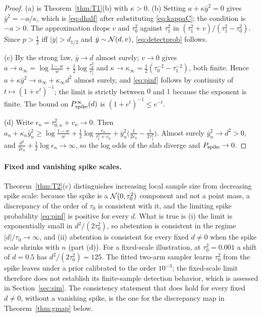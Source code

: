 \begin{proof}
(a) is Theorem~\ref{thm:T1}(b) with $\kappa>0$. (b) Setting $a+\kappa\bar y^2=0$ gives $\bar y^2=-a/\kappa$, which is \eqref{eq:dhalf} after substituting \eqref{eq:kappaC}; the condition is $-a>0$. The approximation drops $v$ and $\tau_0^2$ against $\tau_1^2$ in $(\tau_1^2+v)/(\tau_1^2-\tau_0^2)$. Since $p>\tfrac12$ iff $|\bar y|>d_{1/2}$ and $\bar y\sim\mathcal{N}(d,v)$, \eqref{eq:detectprob} follows.

(c) By the strong law, $\bar y\to d$ almost surely; $v\to0$ gives $a\to a_\infty=\log\frac{1-w}{w}+\frac12\log\frac{\tau_0^2}{\tau_1^2}$ and $\kappa\to\kappa_\infty=\frac12(\tau_0^{-2}-\tau_1^{-2})$, both finite. Hence $a+\kappa\bar y^2\to a_\infty+\kappa_\infty d^2$ almost surely, and \eqref{eq:pinf} follows by continuity of $t\mapsto(1+e^t)^{-1}$; the limit is strictly between $0$ and $1$ because the exponent is finite. The bound on $P_{\mathrm{spike}}^\infty(d)$ is $(1+e^t)^{-1}\le e^{-t}$.

(d) Write $\epsilon_n=\tau_{0,n}^2+v_n\to0$. Then $a_n+\kappa_n\bar y_n^2\ge\log\frac{1-w}{w}+\frac12\log\frac{\epsilon_n}{\tau_1^2+v_n}+\bar y_n^2\bigl(\frac1{2\epsilon_n}-\frac1{2\tau_1^2}\bigr)$. Almost surely $\bar y_n^2\to d^2>0$, and $\frac{d^2}{2\epsilon_n}+\frac12\log\epsilon_n\to\infty$, so the log odds of the slab diverge and $P_{\mathrm{spike}}\to0$.
\end{proof}

\paragraph{Fixed and vanishing spike scales.}
Theorem~\ref{thm:T2}(c) distinguishes increasing local sample size from decreasing spike scale: because the spike is a $\mathcal{N}(0,\tau_0^2)$ component and not a point mass, a discrepancy of the order of $\tau_0$ is consistent with it, and the limiting spike probability \eqref{eq:pinf} is positive for every $d$. What is true is (i) the limit is exponentially small in $d^2/(2\tau_0^2)$, so abstention is consistent in the regime $|d|/\tau_0\to\infty$, and (ii) abstention is consistent for every fixed $d\ne0$ when the spike scale shrinks with $n$ (part (d)). For a fixed-scale illustration, at $\tau_0^2=0.001$ a shift of $d=0.5$ has $d^2/(2\tau_0^2)=125$. The fitted two-arm sampler learns $\tau_0^2$ from the spike leaves under a prior calibrated to the order $10^{-3}$; the fixed-scale limit therefore does not establish its finite-sample detection behavior, which is assessed in Section~\ref{sec:sim}. The consistency statement that does hold for every fixed $d\ne0$, without a vanishing spike, is the one for the discrepancy map in Theorem~\ref{thm:gmap} below.

